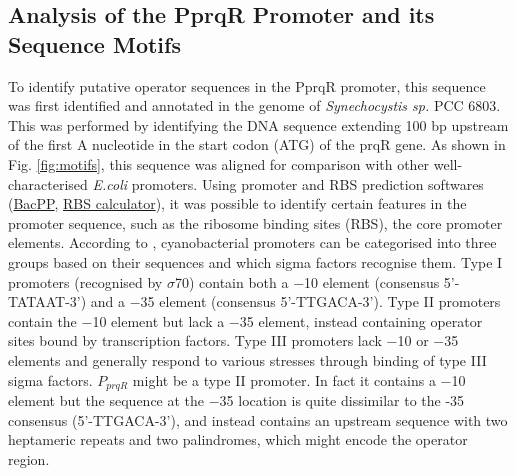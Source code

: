 \subsection*{Analysis of the PprqR Promoter and its Sequence Motifs}
To identify putative operator sequences in the PprqR promoter, this sequence was first identified and annotated in the genome of \textit{Synechocystis sp.} PCC 6803. This was performed by identifying the DNA sequence extending 100 bp upstream of the first A nucleotide in the start codon (ATG) of the prqR gene. As shown in Fig. \ref{fig:motifs}, this sequence was aligned for comparison with other well-characterised  \textit{E.coli} promoters. Using promoter and RBS prediction softwares (\href{http://www.bacpp.bioinfoucs.com/home}{BacPP}, \href{https://salislab.net/software/}{RBS calculator}), it was possible to identify certain features in the promoter sequence, such as the ribosome binding sites (RBS), the core promoter elements. According to \cite{Gordon2018}, cyanobacterial promoters can be categorised into three groups based on their sequences and which sigma factors recognise them. Type I promoters (recognised by $\sigma$70) contain both a −10 element (consensus 5’-TATAAT-3’) and a −35 element (consensus 5’-TTGACA-3’). Type II promoters contain the −10 element but lack a −35 element, instead containing operator sites bound by transcription factors. Type III promoters lack −10 or −35 elements and generally respond to various stresses through binding of type III sigma factors.
$P_{prqR}$ might be a type II promoter. In fact it contains a −10 element but the sequence at the −35 location is quite dissimilar to the -35 consensus (5’-TTGACA-3’), and instead contains an upstream sequence with two heptameric repeats and two palindromes, which might encode the operator region.

